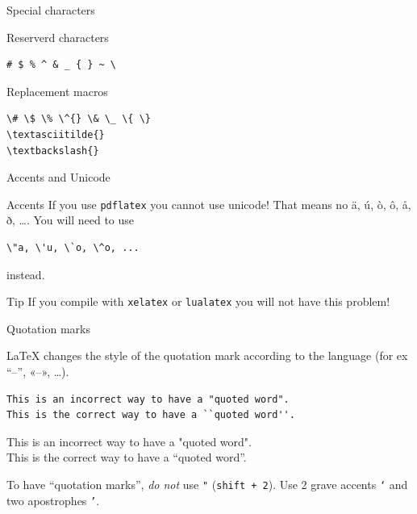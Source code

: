 \documentclass[xetex, onlymath, handout]{beamer}
\begin{document}
\begin{frame}[fragile]{Special characters}
\begin{block}{Reserverd characters}
\LARGE
\begin{verbatim}
# $ % ^ & _ { } ~ \
\end{verbatim}
\end{block}
\begin{alertblock}{Replacement macros}
\Large
\begin{verbatim}
\# \$ \% \^{} \& \_ \{ \}
\textasciitilde{}
\textbackslash{}
\end{verbatim}
\end{alertblock}
\end{frame}
\begin{frame}[fragile]{Accents and Unicode}
  \begin{block}{Accents}
    \Large
    If you use \texttt{pdflatex} you cannot use unicode! That means no ä, ú, ò, ô, å, ð, \ldots.
    You will need to use
\begin{verbatim}
\"a, \'u, \`o, \^o, ...
\end{verbatim}
    instead.
  \end{block}
  \begin{alertblock}{Tip}
    If you compile with \texttt{xelatex} or \texttt{lualatex} you will not have this problem!
  \end{alertblock}
\end{frame}

\begin{frame}[fragile]{Quotation marks}
  \begin{block}{}
    \textrm{\LaTeX} changes the style of the quotation mark according to the language (for ex ``--'', «--», \ldots).
  \end{block}
  \begin{exampleblock}{}
    \large
\begin{lstlisting}[escapechar=!]
This is an incorrect way to have a "quoted word".
This is the correct way to have a ``quoted word''.
\end{lstlisting}
This is an incorrect way to have a "quoted word". \\
This is the correct way to have a ``quoted word''.
  \end{exampleblock}
  \begin{alertblock}{}
    \large
    To have ``quotation marks'', \emph{do not} use \texttt{"} (\texttt{shift + 2}).
    Use 2 grave accents \texttt{`} and two apostrophes \texttt{'}.
  \end{alertblock}
\end{frame}
\end{document}
